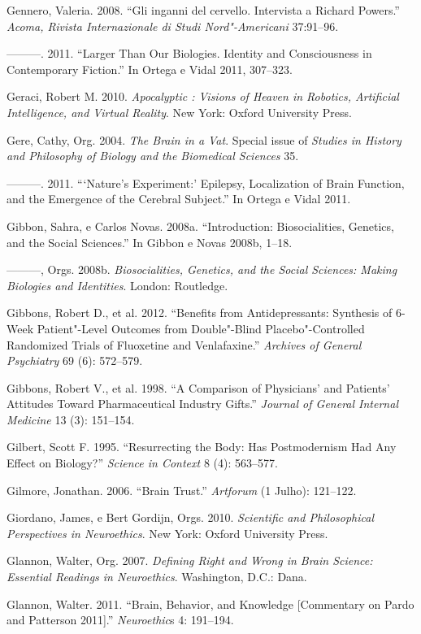 Gennero, Valeria. 2008. ``Gli inganni del cervello. Intervista a Richard
Powers.'' \emph{Acoma, Rivista Internazionale di Studi Nord"-Americani}
37:91--96.

---------. 2011. ``Larger Than Our Biologies. Identity and Consciousness
in Contemporary Fiction.'' In Ortega e Vidal 2011, 307--323.

Geraci, Robert M. 2010. \emph{Apocalyptic : Visions of Heaven in
Robotics, Artificial Intelligence, and Virtual Reality}. New York:
Oxford University Press.

Gere, Cathy, Org. 2004. \emph{The Brain in a Vat}. Special issue of
\emph{Studies in History and Philosophy of Biology and the Biomedical
Sciences} 35.

---------. 2011. ```Nature's Experiment:' Epilepsy, Localization of
Brain Function, and the Emergence of the Cerebral Subject.'' In Ortega e
Vidal 2011.

Gibbon, Sahra, e Carlos Novas. 2008a. ``Introduction: Biosocialities,
Genetics, and the Social Sciences.'' In Gibbon e Novas 2008b, 1--18.

---------, Orgs. 2008b. \emph{Biosocialities, Genetics, and the Social
Sciences: Making Biologies and Identities}. London: Routledge.

Gibbons, Robert D., et al. 2012. ``Benefits from Antidepressants:
Synthesis of 6-Week Patient"-Level Outcomes from Double"-Blind
Placebo"-Controlled Randomized Trials of Fluoxetine and Venlafaxine.''
\emph{Archives of General Psychiatry} 69 (6): 572--579.

Gibbons, Robert V., et al. 1998. ``A Comparison of Physicians' and
Patients' Attitudes Toward Pharmaceutical Industry Gifts.''
\emph{Journal of General Internal Medicine} 13 (3): 151--154.

Gilbert, Scott F. 1995. ``Resurrecting the Body: Has Postmodernism Had
Any Effect on Biology?'' \emph{Science in Context} 8 (4): 563--577.

Gilmore, Jonathan. 2006. ``Brain Trust.'' \emph{Artforum} (1 Julho):
121--122.

Giordano, James, e Bert Gordijn, Orgs. 2010. \emph{Scientific and
Philosophical Perspectives in Neuroethics}. New York: Oxford University
Press.

Glannon, Walter, Org. 2007. \emph{Defining Right and Wrong in Brain
Science: Essential Readings in Neuroethics}. Washington, D.C.: Dana.

Glannon, Walter. 2011. ``Brain, Behavior, and Knowledge {[}Commentary on
Pardo and Patterson 2011{]}.'' \emph{Neuroethic}s 4: 191--194.

